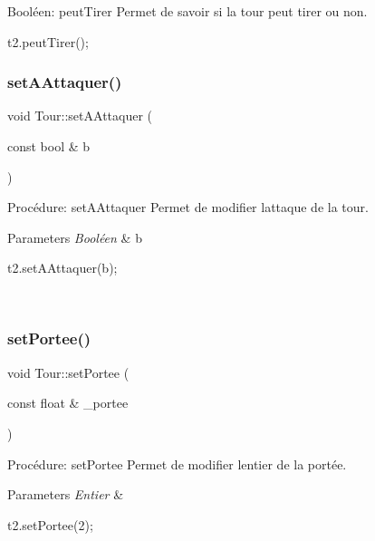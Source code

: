 Booléen\+: peut\+Tirer Permet de savoir si la tour peut tirer ou non. 


\begin{DoxyCode}
t2.peutTirer();
\end{DoxyCode}
 \mbox{\label{classTour_ab1f278b35be5caa0694a1d8ec8b152ba}} 
\subsubsection{\texorpdfstring{set\+A\+Attaquer()}{setAAttaquer()}}
{\footnotesize\ttfamily void Tour\+::set\+A\+Attaquer (\begin{DoxyParamCaption}\item[{const bool \&}]{b }\end{DoxyParamCaption})}



Procédure\+: set\+A\+Attaquer Permet de modifier l\textquotesingle{}attaque de la tour. 


\begin{DoxyParams}{Parameters}
{\em Booléen} & b 
\begin{DoxyCode}
t2.setAAttaquer(b);
\end{DoxyCode}
 \\
\hline
\end{DoxyParams}
\mbox{\label{classTour_a7f9a17a8138ebd8afe72520d7d8a18db}} 
\subsubsection{\texorpdfstring{set\+Portee()}{setPortee()}}
{\footnotesize\ttfamily void Tour\+::set\+Portee (\begin{DoxyParamCaption}\item[{const float \&}]{\+\_\+portee }\end{DoxyParamCaption})}



Procédure\+: set\+Portee Permet de modifier l\textquotesingle{}entier de la portée. 


\begin{DoxyParams}{Parameters}
{\em Entier} & 
\begin{DoxyCode}
t2.setPortee(2);
\end{DoxyCode}
 \\
\hline
\end{DoxyParams}
\mbox{\label{classTour_a1db07b7ed15a7b0d11e96bb67831feba}} 
